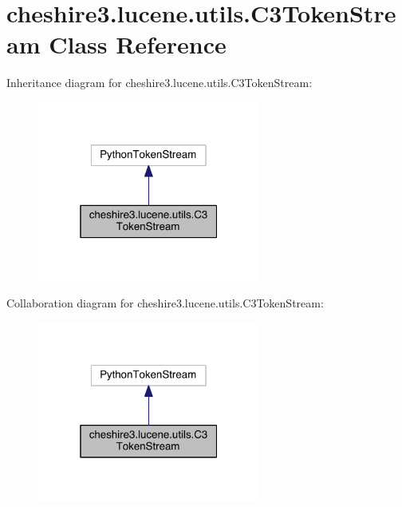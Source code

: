 \hypertarget{classcheshire3_1_1lucene_1_1utils_1_1_c3_token_stream}{\section{cheshire3.\-lucene.\-utils.\-C3\-Token\-Stream Class Reference}
\label{classcheshire3_1_1lucene_1_1utils_1_1_c3_token_stream}
}


Inheritance diagram for cheshire3.\-lucene.\-utils.\-C3\-Token\-Stream\-:
\nopagebreak
\begin{figure}[H]
\begin{center}
\leavevmode
\includegraphics[width=208pt]{classcheshire3_1_1lucene_1_1utils_1_1_c3_token_stream__inherit__graph}
\end{center}
\end{figure}


Collaboration diagram for cheshire3.\-lucene.\-utils.\-C3\-Token\-Stream\-:
\nopagebreak
\begin{figure}[H]
\begin{center}
\leavevmode
\includegraphics[width=208pt]{classcheshire3_1_1lucene_1_1utils_1_1_c3_token_stream__coll__graph}
\end{center}
\end{figure}
